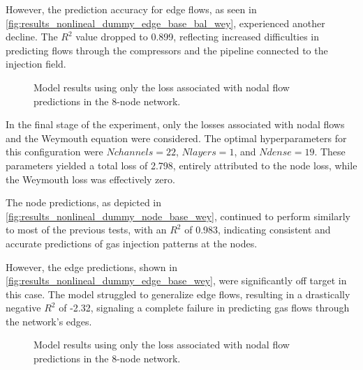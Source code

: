 However, the prediction accuracy for edge flows, as seen in \cref{fig:results_nonlineal_dummy_edge_base_bal_wey}, experienced another decline. The $R^2$ value dropped to 0.899, reflecting increased difficulties in predicting flows through the compressors and the pipeline connected to the injection field. 



\begin{figure}
    \centering
    \setlength{}        
    \setlength{} 
    
    \caption{Model results using only the loss associated with nodal flow predictions in the 8-node network.}
    \label{fig:dummy_base_results}
\end{figure}



In the final stage of the experiment, only the losses associated with nodal flows and the Weymouth equation were considered. The optimal hyperparameters for this configuration were $ N channels=22$, $ N layers=1$, and $ N dense=19$. These parameters yielded a total loss of 2.798, entirely attributed to the node loss, while the Weymouth loss was effectively zero.

The node predictions, as depicted in \cref{fig:results_nonlineal_dummy_node_base_wey}, continued to perform similarly to most of the previous tests, with an $R^2$ of 0.983, indicating consistent and accurate predictions of gas injection patterns at the nodes.

However, the edge predictions, shown in \cref{fig:results_nonlineal_dummy_edge_base_wey}, were significantly off target in this case. The model struggled to generalize edge flows, resulting in a drastically negative $R^2$ of -2.32, signaling a complete failure in predicting gas flows through the network's edges. 

\begin{figure}
    \centering
    \setlength{}        
    \setlength{} 
    
    \caption{Model results using only the loss associated with nodal flow predictions in the 8-node network.}
    \label{fig:dummy_base_results}
\end{figure}





